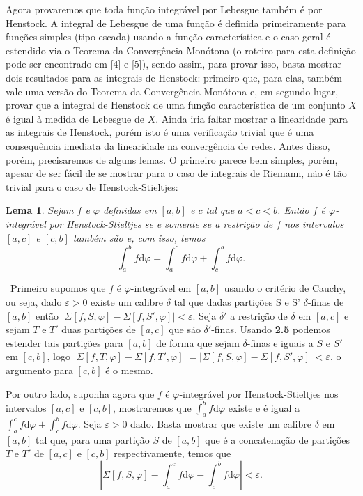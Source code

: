 \documentclass[12pt, a4paper]{article}
\newtheorem{lem}[mydef]{Lema}
\def\dem{\par\smallbreak\noindent {\textit{ Demonstração:}} \ }
\theoremstyle{definition}
\begin{document}
Agora provaremos que toda função integrável por Lebesgue também é por Henstock. A integral de Lebesgue de uma função é definida primeiramente para funções simples (tipo escada) usando a função característica e o caso geral é estendido via o Teorema da Convergência Monótona (o roteiro para esta definição pode ser encontrado em [4] e [5]), sendo assim, para provar isso, basta mostrar dois resultados para as integrais de Henstock: primeiro que, para elas, também vale uma versão do Teorema da Convergência Monótona e, em segundo lugar, provar que a integral de Henstock de uma função característica de um conjunto $X$ é igual à medida de Lebesgue de $X$. Ainda iria faltar mostrar a linearidade para as integrais de Henstock, porém isto é uma verificação trivial que é uma consequência imediata da linearidade na convergência de redes. Antes disso, porém, precisaremos de alguns lemas. O primeiro parece bem simples, porém, apesar de ser fácil de se mostrar para o caso de integrais de Riemann, não é tão trivial para o caso de Henstock-Stieltjes:  

\begin{lem}
	
	Sejam $f$ e $\varphi$ definidas em $[a,b]$ e $c$ tal que $a<c<b$. Então $f$ é $\varphi$-integrável por Henstock-Stieltjes se e somente se a restrição de $f$ nos intervalos $[a,c]$ e $[c,b]$ também são e, com isso, temos $$\int_a^b f  \text{d}\varphi = \int_a^c f  \text{d}\varphi +\int_c^b f  \text{d}\varphi .$$ 
	
\end{lem}

\dem Primeiro supomos que $f$ é $\varphi$-integrável em $[a,b]$ usando o critério de Cauchy, ou seja, dado $\varepsilon >0$ existe um calibre $\delta$ tal que dadas partições S e S' $\delta$-finas de $[a,b]$ então $|\Sigma[f,S,\varphi]-\Sigma[f,S',\varphi]|< \varepsilon$. Seja $\delta'$ a restrição de $\delta$ em $[a,c]$ e sejam $T$ e $T'$ duas partições de $[a,c]$ que são $\delta'$-finas. Usando \textbf{2.5} podemos estender tais partições para $[a,b]$ de forma que sejam $\delta$-finas e iguais a $S$ e $S'$ em $[c,b]$, logo $|\Sigma[f,T,\varphi]-\Sigma[f,T',\varphi]|=|\Sigma[f,S,\varphi]-\Sigma[f,S',\varphi]|< \varepsilon$, o argumento para $[c,b]$ é o mesmo.

Por outro lado, suponha agora que  $f$ é $\varphi$-integrável por Henstock-Stieltjes nos intervalos $[a,c]$ e $[c,b]$, mostraremos que $\int_a^b f  \text{d}\varphi$ existe e é igual a $\int_a^c f  \text{d}\varphi +\int_c^b f  \text{d}\varphi $. Seja $\varepsilon >0$ dado. Basta mostrar que existe um calibre $\delta$ em $[a,b]$ tal que, para uma partição $S$ de $[a,b]$ que é a concatenação de partições $T$ e $T'$ de  $[a,c]$ e $[c,b]$ respectivamente, temos que $$\left| \Sigma[f,S,\varphi] - \int_a^c f \text{d}\varphi -\int_c^b f  \text{d}\varphi\right|< \varepsilon.$$
\end{document}
